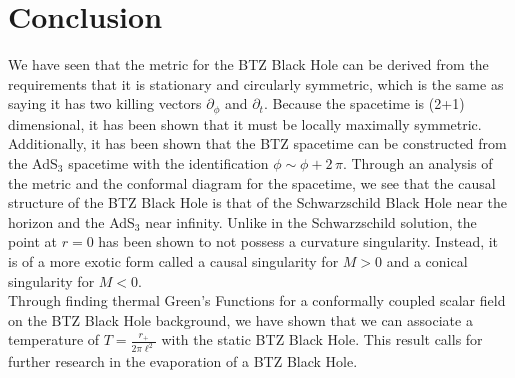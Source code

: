 %
\section{Conclusion}
We have seen that the metric for the BTZ Black Hole can be derived from the requirements that it is stationary and circularly symmetric, which is the same as saying it has two killing vectors $\partial_\phi$ and $\partial_t$. Because the spacetime is (2+1) dimensional, it has been shown that it must be locally maximally symmetric. Additionally, it has been shown that the BTZ spacetime can be constructed from the AdS$_3$ spacetime with the identification $\phi \sim \phi + 2 \, \pi$. Through an analysis of the metric and the conformal diagram for the spacetime, we see that the causal structure of the BTZ Black Hole is that of the Schwarzschild Black Hole near the horizon and the AdS$_3$ near infinity. Unlike in the Schwarzschild solution, the point at $r = 0$ has been shown to not possess a curvature singularity. Instead, it is of a more exotic form called a causal singularity for $M > 0$ and a conical singularity for $M < 0$.\\
Through finding thermal Green's Functions for a conformally coupled scalar field on the BTZ Black Hole background, we have shown that we can associate a temperature of $T = \frac{r_+}{2 \pi \ell^2}$ with the static BTZ Black Hole. This result calls for further research in the evaporation of a BTZ Black Hole.
